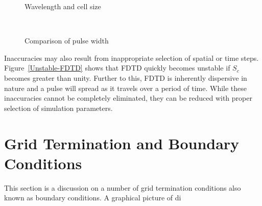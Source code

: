 \begin{figure}[htb]
\caption{Wavelength and cell size}
\label{Wavelength-Vs-Cell-Size}
\end{figure}
\begin{figure}[htb]
\centering
\mbox{\quad{}}\\
\mbox{\quad{}}
\caption{Comparison of pulse width}
\label{Pulsewidth-comparison}
\end{figure}
Inaccuracies may also result from inappropriate selection of spatial or time steps. Figure~\ref{Unstable-FDTD} shows that FDTD quickly becomes unstable if $S_c$ becomes greater than unity. Further to this, FDTD is inherently dispersive in nature and a pulse will spread as it travels over a period of time. While these inaccuracies cannot be completely eliminated, they can be reduced with proper selection of simulation parameters.
\section{Grid Termination and Boundary Conditions}
This section is a discussion on a number of grid termination conditions also known as boundary conditions. A graphical picture of di